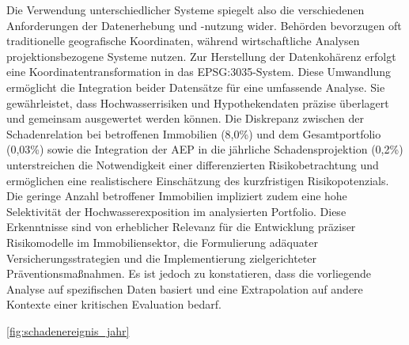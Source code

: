 Die Verwendung unterschiedlicher Systeme spiegelt also die verschiedenen Anforderungen der Datenerhebung und -nutzung wider. Behörden bevorzugen oft traditionelle geografische Koordinaten, während wirtschaftliche Analysen projektionsbezogene Systeme nutzen.
Zur Herstellung der Datenkohärenz erfolgt eine Koordinatentransformation in das EPSG:3035-System. Diese Umwandlung ermöglicht die Integration beider Datensätze für eine umfassende Analyse. Sie gewährleistet, dass Hochwasserrisiken und Hypothekendaten präzise überlagert und gemeinsam ausgewertet werden können.
Die Diskrepanz zwischen der Schadenrelation bei betroffenen Immobilien (8,0\%) und dem Gesamtportfolio (0,03\%) sowie die Integration der AEP in die jährliche Schadensprojektion (0,2\%) unterstreichen die Notwendigkeit einer differenzierten Risikobetrachtung und ermöglichen eine realistischere Einschätzung des kurzfristigen Risikopotenzials. Die geringe Anzahl betroffener Immobilien impliziert zudem eine hohe Selektivität der Hochwasserexposition im analysierten Portfolio. Diese Erkenntnisse sind von erheblicher Relevanz für die Entwicklung präziser Risikomodelle im Immobiliensektor, die Formulierung adäquater Versicherungsstrategien und die Implementierung zielgerichteter Präventionsmaßnahmen. Es ist jedoch zu konstatieren, dass die vorliegende Analyse auf spezifischen Daten basiert und eine Extrapolation auf andere Kontexte einer kritischen Evaluation bedarf.

\ref{fig:schadenereignis_jahr} 